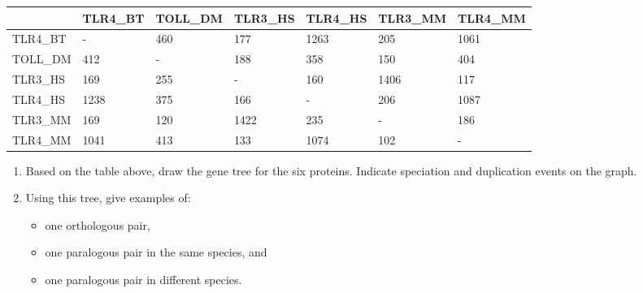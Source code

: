 \documentclass[a4paper,11pt]{article}
\begin{document}
\begin{center}
	\begin{tabular} {| l || l | l | l | l | l | l |}
	\hline
 	                    & TLR4\_BT&TOLL\_DM & TLR3\_HS& TLR4\_HS&  TLR3\_MM& TLR4\_MM\\ \hline\hline
	TLR4\_BT        & -            & 460             &  177         & 1263       &205           & 1061 \\	\hline
	TOLL\_DM      & 412       & -                  &  188        & 358       & 150           & 404 \\	\hline
	TLR3\_HS       & 169      & 255              & -             & 160       &1406           & 117 \\	\hline
	TLR4\_HS       &1238      & 375              & 166        & -            & 206           & 1087 \\	\hline
	TLR3\_MM    & 169      & 120              & 1422      & 235       & -                & 186 \\ 	\hline
	TLR4\_MM    & 1041      & 413              & 133        & 1074       & 102           & - \\
	\hline
	\end{tabular}
\end{center}
\vspace{0.05 cm}

\begin{enumerate}
\item Based on the table above, draw the gene tree for the six proteins.
  Indicate speciation and duplication events on the graph.
\item Using this tree, give examples of:
  \begin{itemize} 
  \item one orthologous pair, 
  \item one paralogous pair in the same species, and 
  \item one paralogous pair in different species.
  \end{itemize}
\end{enumerate}
\end{document}
